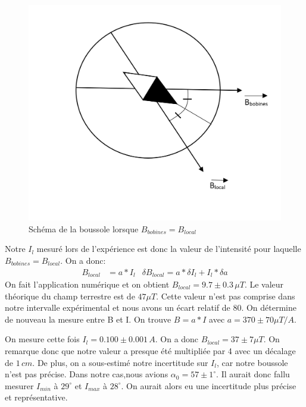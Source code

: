 \documentclass[12pt]{article}
\begin{document}
\begin{figure}[!h]
	\begin{center}
		\includegraphics[scale=0.5]{img/Boussole.png}
	\end{center}
	\label{SchmBouss}
	\caption{Schéma de la boussole lorsque $B_{bobines}=B_{local}$}
\end{figure}

Notre $I_l$ mesuré lors de l'expérience est donc la valeur de l'intensité pour laquelle $B_{bobines}=B_{local}$. On a donc:
\begin{align*}
B_{local}&=a*I_l & \delta B_{local}=a*\delta I_l + I_l * \delta a
\end{align*}
On fait l'application numérique et on obtient $B_{local}=9.7\pm 0.3\, \mu T$. Le valeur théorique du champ terrestre est de $47\mu T$. Cette valeur n'est pas comprise dans notre intervalle expérimental et nous avons un écart relatif de 80. %
On détermine de nouveau la mesure entre B et I. On trouve $B=a*I$ avec $a=370\pm 70 \mu T/A$. 

On mesure cette fois $I_l=0.100\pm 0.001 \, A$. On a donc $B_{local}=37\pm 7 \mu T$. On remarque donc que notre valeur a presque été multipliée par 4 avec un décalage de $1\, cm$. De plus, on a sous-estimé notre incertitude sur $I_l$, car notre boussole n'est pas précise. Dans notre cas,nous avions $\alpha_0=57\pm 1^\circ$. Il aurait donc fallu mesurer $I_{min}$ à $29^\circ$ et $I_{max}$ à $28^\circ$. On aurait alors eu une incertitude plus précise et représentative. 
\end{document}
